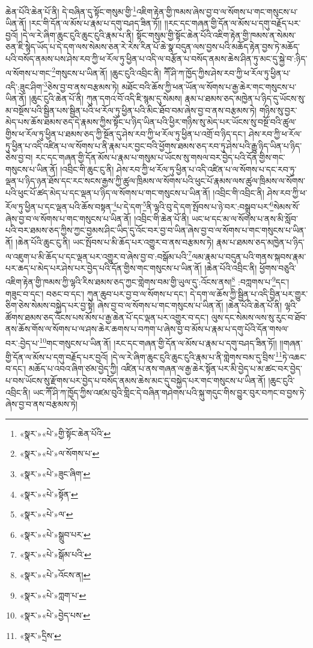 ཆེན་པོའི་ཆེན་པོ་ནི། དེ་བཞིན་དུ་སྟོང་གསུམ་གྱི་\footnote{«སྣར་»«པེ་»གྱི་སྟོང་ཆེན་པོའི་}འཇིག་རྟེན་གྱི་ཁམས་ཞེས་བྱ་བ་ལ་སོགས་པ་གང་གསུངས་པ་ཡིན་ནོ། །རང་གི་དོན་ལ་མོས་པ་རྣམ་པ་དགུ་བཤད་ཟིན་ཏོ།། །།རང་དང་གཞན་གྱི་དོན་ལ་མོས་པ་དགུ་བརྗོད་པར་བྱའོ། །དེ་ལ་རེ་ཞིག་ཆུང་ངུའི་ཆུང་ངུའི་རྣམ་པ་ནི། སྟོང་གསུམ་གྱི་སྟོང་ཆེན་པོའི་འཇིག་རྟེན་གྱི་ཁམས་ན་སེམས་ཅན་ཇི་སྙེད་ཡོད་པ་དེ་དག་ལས་སེམས་ཅན་རེ་རེས་རིན་པོ་ཆེ་སྣ་བདུན་ལས་བྱས་པའི་མཆོད་རྟེན་བྱས་ཏེ་མཆོད་པའི་བསོད་ནམས་པས་ཤེས་རབ་ཀྱི་ཕ་རོལ་ཏུ་ཕྱིན་པ་འདི་ལ་བརྩོན་པ་བསོད་ནམས་ཆེས་ཤིན་ཏུ་མང་དུ་སྐྱེ་བ་:ཉིད་ལ་སོགས་པ་གང་\footnote{«སྣར་»«པེ་»ལ་སོགས་པ་}གསུངས་པ་ཡིན་ནོ། །ཆུང་ངུའི་འབྲིང་ནི། ཀཽ་ཤི་ཀ་ཁྱོད་ཀྱིས་ཤེས་རབ་ཀྱི་ཕ་རོལ་ཏུ་ཕྱིན་པ་འདི་:ཟུང་ཤིག་\footnote{«སྣར་»«པེ་»ཟུང་ཞིག་}ཅེས་བྱ་བ་ནས་བརྩམས་ཏེ། མཐོང་བའི་ཆོས་ཀྱི་ཕན་ཡོན་ལ་སོགས་པ་རྒྱ་ཆེར་གང་གསུངས་པ་ཡིན་ནོ། །ཆུང་ངུའི་ཆེན་པོ་ནི། ཀུན་དགའ་བོ་འདི་ཇི་སྙམ་དུ་སེམས། རྣམ་པ་ཐམས་ཅད་མཁྱེན་པ་ཉིད་དུ་ཡོངས་སུ་མ་བསྔོས་པའི་སྦྱིན་པས་སྦྱིན་པའི་ཕ་རོལ་ཏུ་ཕྱིན་པའི་མིང་ཐོབ་བམ་ཞེས་བྱ་བ་ནས་བརྩམས་ཏེ། གཉིས་སུ་བྱར་མེད་པས་ཆོས་ཐམས་ཅད་དེ་རྣམས་ཀྱིས་སྟོང་པ་ཉིད་ཡིན་པའི་ཕྱིར་གཉིས་སུ་མེད་པར་ཡོངས་སུ་བསྔོ་བའི་ཚུལ་གྱིས་ཕ་རོལ་ཏུ་ཕྱིན་པ་ཐམས་ཅད་ཀྱི་སྔོན་དུ་ཤེས་རབ་ཀྱི་ཕ་རོལ་ཏུ་ཕྱིན་པ་འགྲོ་བ་ཉིད་དང་། ཤེས་རབ་ཀྱི་ཕ་རོལ་ཏུ་ཕྱིན་པ་འདི་འཛིན་པ་ལ་སོགས་པ་ནི་རྣམ་པར་བྱང་བའི་ཕྱོགས་ཐམས་ཅད་རབ་ཏུ་ཤེས་པའི་རྒྱུ་ཉིད་ཡིན་པ་ཉིད་ཅེས་བྱ་བ། རང་དང་གཞན་གྱི་དོན་མོས་པ་རྣམ་པ་གསུམ་པ་ཡོངས་སུ་གསལ་བར་བྱེད་པའི་དོན་གྱིས་གང་གསུངས་པ་ཡིན་ནོ། །འབྲིང་གི་ཆུང་ངུ་ནི། ཤེས་རབ་ཀྱི་ཕ་རོལ་ཏུ་ཕྱིན་པ་འདི་འཛིན་པ་ལ་སོགས་པ་དང་རབ་ཏུ་ལྡན་པ་ཉིད་ཉན་ཐོས་དང་རང་སངས་རྒྱས་ཀྱི་ཚུལ་ཁྲིམས་ལ་སོགས་པའི་ཕུང་པོ་རྣམས་ལས་ཚུལ་ཁྲིམས་ལ་སོགས་པའི་ཕུང་པོ་ཚད་མེད་པ་དང་ལྡན་པ་ཉིད་ལ་སོགས་པ་གང་གསུངས་པ་ཡིན་ནོ། །འབྲིང་གི་འབྲིང་ནི། ཤེས་རབ་ཀྱི་ཕ་རོལ་ཏུ་ཕྱིན་པ་དང་ལྡན་པའི་ཆོས་བསྟན་\footnote{«སྣར་»«པེ་»སྟོན་}པ་དེ་དག་\footnote{«སྣར་»«པེ་»ལ་}ནི་ལྷའི་བུ་དེ་དག་སྤོབས་པ་ཉེ་བར་:བསྒྲུབ་པར་\footnote{«སྣར་»«པེ་»སྒྲུབ་པར་}སེམས་སོ་ཞེས་བྱ་བ་ལ་སོགས་པ་གང་གསུངས་པ་ཡིན་ནོ། །འབྲིང་གི་ཆེན་པོ་ནི། ཡང་ཕ་དང་མ་ལ་སོགས་པ་ནས་མི་སློབ་པའི་བར་ཐམས་ཅད་ཀྱིས་ཀྱང་བྱམས་ཤིང་ཡིད་དུ་འོང་བར་བྱ་བ་ཡིན་ཞེས་བྱ་བ་ལ་སོགས་པ་གང་གསུངས་པ་ཡིན་ནོ། །ཆེན་པོའི་ཆུང་ངུ་ནི། ཡང་སྤོབས་པ་མི་ཆོད་པར་འགྱུར་བ་ནས་བརྩམས་ཏེ། རྣམ་པ་ཐམས་ཅད་མཁྱེན་པ་ཉིད་ལ་འཇུག་པ་མི་ཆོད་པ་དང་ལྡན་པར་འགྱུར་བ་ཞེས་བྱ་བ་:བསྒོམ་པའི་\footnote{«སྣར་»«པེ་»སྒོམ་པའི་}ལམ་རྣམ་པ་བདུན་པའི་གནས་སྐབས་རྣམ་པར་ཆད་པ་མེད་པར་ཤེས་པར་བྱེད་པའི་དོན་གྱིས་གང་གསུངས་པ་ཡིན་ནོ། །ཆེན་པོའི་འབྲིང་ནི། ཕྱོགས་བཅུའི་འཇིག་རྟེན་གྱི་ཁམས་ཀྱི་ལྷའི་རིས་ཐམས་ཅད་ཀྱང་གླེགས་བམ་གྱི་ཡུལ་དུ་:འོངས་ནས།\footnote{«སྣར་»«པེ་»འོངས་ན།} :བཀླགས་པ་\footnote{«སྣར་»«པེ་»ཀླག་པ་}དང་། གཟུང་བ་དང་། བཅང་བ་དང་། ཀུན་ཆུབ་པར་བྱ་བ་ལ་སོགས་པ་དང་། དེ་དག་ལ་ཆོས་ཀྱི་སྦྱིན་པ་འདི་བྱིན་པར་གྱུར་ཅིག་ཅེས་སེམས་བསྐྱེད་པར་བྱ་སྟེ། ཞེས་བྱ་བ་ལ་སོགས་པ་གང་གསུངས་པ་ཡིན་ནོ། །ཆེན་པོའི་ཆེན་པོ་ནི། ལྷའི་ཚོགས་ཐམས་ཅད་འོངས་པས་མོས་པ་རྒྱ་ཆེན་པོ་དང་ལྡན་པར་འགྱུར་བ་དང་། ལུས་དང་སེམས་ལས་སུ་རུང་བ་ཐོབ་ནས་ཆོས་གོས་ལ་སོགས་པ་ལ་ཤས་ཆེར་ཆགས་པ་བཀག་པ་ཞེས་བྱ་བ་མོས་པ་རྣམ་པ་དགུ་པོའི་དོན་གསལ་བར་:བྱེད་པ་\footnote{«སྣར་»«པེ་»བྱེད་པས་}གང་གསུངས་པ་ཡིན་ནོ། །རང་དང་གཞན་གྱི་དོན་ལ་མོས་པ་རྣམ་པ་དགུ་བཤད་ཟིན་ཏོ།། །།གཞན་གྱི་དོན་ལ་མོས་པ་དགུ་བརྗོད་པར་བྱའོ། །དེ་ལ་རེ་ཞིག་ཆུང་ངུའི་ཆུང་ངུའི་རྣམ་པ་ནི་གླེགས་བམ་དུ་བྲིས་\footnote{«སྣར་»དྲིས་}ཏེ་འཆང་བ་དང་། མཆོད་པ་འབའ་ཞིག་ཙམ་བྱེད་ཀྱི། འཛིན་པ་ནས་གཞན་ལ་རྒྱ་ཆེར་སྟོན་པར་མི་བྱེད་པ་མ་ཚང་བར་བྱེད་པ་བས་ཡོངས་སུ་རྫོགས་པར་བྱེད་པ་བསོད་ནམས་ཆེས་མང་དུ་བསྐྱེད་པར་གང་གསུངས་པ་ཡིན་ནོ། །ཆུང་ངུའི་འབྲིང་ནི། ཡང་ཀཽ་ཤི་ཀ་ཁྱོད་ཀྱིས་འཛམ་བུའི་གླིང་དེ་བཞིན་གཤེགས་པའི་སྐུ་གདུང་གིས་བྱུར་བུར་བཀང་བ་བྱས་ཏེ་ཞེས་བྱ་བ་ནས་བརྩམས་ཏེ། 